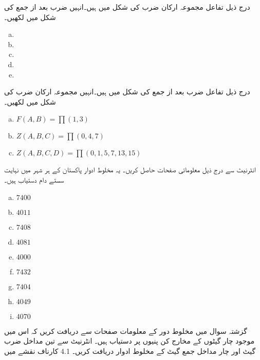 درج ذیل تفاعل مجموعہ ارکان ضرب کی شکل میں ہیں۔انہیں  ضرب بعد از جمع کی شکل میں لکھیں۔
\begin{multicols}{2}
\begin{enumerate}[a.]
\item
\item
\item
\item
\item
\end{enumerate}
\end{multicols}
درج ذیل تفاعل  ضرب بعد از جمع کی شکل میں ہیں۔انہیں مجموعہ ارکان ضرب کی شکل میں لکھیں۔
\begin{multicols}{2}
\begin{enumerate}[a.]
\item
\( F(A,B)=\prod (1,3)\)
\item
\( Z(A,B,C)=\prod (0,4,7) \)
\item
\( Z(A,B,C,D)=\prod (0,1,5,7,13,15) \)
\end{enumerate}
\end{multicols}
انٹرنیٹ  سے درج ذیل معلوماتی صفحات  حاصل کریں۔ یہ مخلوط ادوار پاکستان کے ہر شہر میں نہایت سستے دام  دستیاب ہیں۔
\begin{multicols}{5}
\begin{enumerate}[a.]
\item
 \( 7400 \) 
 \item
  \( 4011  \)
  \item
  \( 7408  \)
  \item
  \(  4081  \)
  \item
  \( 4000  \)
  \item
  \( 7432  \)
  \item
  \( 7404  \)
  \item
  \( 4049  \)
  \item
  \( 4070  \)
\end{enumerate}
\end{multicols}
گزشتہ سوال میں  مخلوط دور  کے  معلومات صفحات سے   دریافت کریں کہ اس میں موجود  چار گیٹوں کے مخارج کن پنیوں پر دستیاب ہیں۔
انٹرنیٹ سے تین مداخل  ضرب گیٹ اور چار مداخل جمع گیٹ کے مخلوط ادوار دریافت کریں۔
4.1 کارناف نقشے میں
